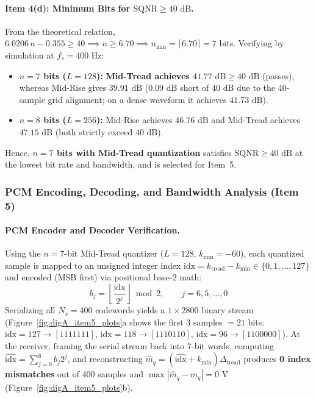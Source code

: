 \documentclass[a4paper]{article}
\begin{document}
\paragraph{Item 4(d): Minimum Bits for $\text{SQNR} \ge 40\text{ dB}$.}
From the theoretical relation, $6.0206\,n - 0.355 \ge 40 \implies n \ge 6.70 \implies n_{\min} = \lceil 6.70 \rceil = 7\text{ bits}$. Verifying by simulation at $f_s = 400\text{ Hz}$:
\begin{itemize}
    \item \textbf{$n = 7$ bits ($L = 128$):} \textbf{Mid-Tread achieves $41.77\text{ dB} \ge 40\text{ dB}$} (passes), whereas Mid-Rise gives $39.91\text{ dB}$ ($0.09\text{ dB}$ short of $40\text{ dB}$ due to the 40-sample grid alignment; on a dense waveform it achieves $41.73\text{ dB}$).
    \item \textbf{$n = 8$ bits ($L = 256$):} Mid-Rise achieves $46.76\text{ dB}$ and Mid-Tread achieves $47.15\text{ dB}$ (both strictly exceed $40\text{ dB}$).
\end{itemize}
Hence, \textbf{$n = 7$ bits with Mid-Tread quantization} satisfies $\text{SQNR} \ge 40\text{ dB}$ at the lowest bit rate and bandwidth, and is selected for Item~5.

\subsubsection{PCM Encoding, Decoding, and Bandwidth Analysis (Item 5)}

\paragraph{PCM Encoder and Decoder Verification.}
Using the $n = 7$-bit Mid-Tread quantizer ($L = 128$, $k_{\min} = -60$), each quantized sample is mapped to an unsigned integer index $\text{idx} = k_{\text{tread}} - k_{\min} \in \{0, 1, \dots, 127\}$ and encoded (MSB first) via positional base-2 math:
\begin{equation}
b_j = \left\lfloor \frac{\text{idx}}{2^j} \right\rfloor \bmod 2, \qquad j = 6, 5, \dots, 0
\end{equation}
Serializing all $N_s = 400$ codewords yields a $1 \times 2800$ binary stream (Figure~\ref{fig:digA_item5_plots}a shows the first 3 samples $= 21$ bits: $\text{idx} = 127 \to [1111111]$, $\text{idx} = 118 \to [1110110]$, $\text{idx} = 96 \to [1100000]$). At the receiver, framing the serial stream back into 7-bit words, computing $\widehat{\text{idx}} = \sum_{j=0}^{6} b_j 2^j$, and reconstructing $\hat{m}_q = (\widehat{\text{idx}} + k_{\min})\Delta_{\text{tread}}$ produces \textbf{0 index mismatches} out of 400 samples and $\max|\hat{m}_q - m_q| = 0\text{ V}$ (Figure~\ref{fig:digA_item5_plots}b).
\end{document}
